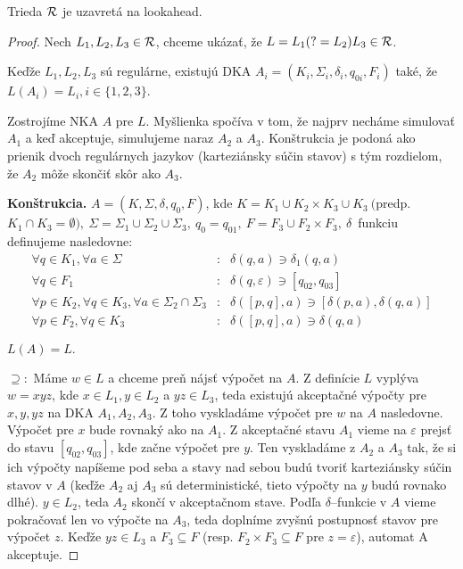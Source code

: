\begin{lema}
Trieda ${\cal R}$ je uzavretá na lookahead.
\end{lema}
\begin{proof}
Nech $ L_{1}, L_{2}, L_{3} \in {\cal R} $, chceme ukázať, že  $ L = L_{1}(?=L_{2})L_{3} \in {\cal R} $.

Keďže $ L_{1},L_{2},L_{3} $ sú regulárne, existujú DKA $ A_{i} = (K_{i},\Sigma_{i},\delta_{i},q_{0i},F_{i}) $ také, že $ L(A_{i})=L_{i}, i \in \lbrace 1,2,3\rbrace $. 

Zostrojíme NKA $ A $ pre $L$. Myšlienka spočíva v tom, že najprv necháme simulovať $A_1$ a keď akceptuje, simulujeme naraz $A_2$ a $A_3$. Konštrukcia je podoná ako prienik dvoch regulárnych jazykov (karteziánsky súčin stavov) s tým rozdielom, že $A_2$ môže skončiť skôr ako $A_3$.

\textbf{Konštrukcia.}  $ A = (K,\Sigma,\delta,q_{0},F) $, kde
$ K = K_{1} \cup K_{2} \times K_{3} \cup K_{3} ~ ( $predp. $ K_{1} \cap K_{3}= \emptyset), ~
\Sigma=\Sigma_{1}\cup\Sigma_{2}\cup\Sigma_{3}, ~ q_{0}=q_{01}, ~ F = F_{3} \cup F_{2} \times F_{3}, ~ \delta $~funkciu definujeme nasledovne:
\begin{eqnarray*}
\forall q \in K_{1}, \forall a \in \Sigma &:& \delta(q,a) \ni \delta_{1}(q,a) \\
\forall q \in F_{1} &:& \delta(q,\varepsilon ) \ni \left[ q_{02},q_{03} \right] \\
\forall p \in K_{2}, \forall q \in K_{3}, \forall a \in \Sigma_{2} \cap \Sigma_{3} &:& \delta( \left[ p,q \right] ,a) \ni \left[ \delta(p,a), \delta (q,a) \right] \\
\forall p \in F_2, \forall q \in K_3 &:& \delta(\left[p,q\right],a) \ni \delta(q,a) 
\end{eqnarray*}

$ L(A) = L. $

$ \supseteq: $ Máme $ w \in L $ a chceme preň nájsť výpočet na $A$. Z definície $L$ vyplýva $w=xyz$, kde $x \in L_1, y \in L_2$ a $yz \in L_3$, teda existujú akceptačné výpočty pre $x,y,yz$ na DKA $A_1,A_2,A_3$. Z toho vyskladáme výpočet pre $w$ na $A$ nasledovne. Výpočet pre $x$ bude rovnaký ako na $A_1$. Z akceptačné stavu $A_1$ vieme na $\varepsilon$ prejsť do stavu $\left[q_{02},q_{03}\right]$, kde začne výpočet pre $y$. Ten vyskladáme z $A_2$ a $A_3$ tak, že si ich výpočty napíšeme pod seba a stavy nad sebou budú tvoriť karteziánsky súčin stavov v $A$ (keďže $A_2$ aj $A_3$ sú deterministické, tieto výpočty na $y$ budú rovnako dlhé). $y \in L_2$, teda $A_2$ skončí v akceptačnom stave. Podľa $\delta$--funkcie v $A$ vieme pokračovať len vo výpočte na $A_3$, teda doplníme zvyšnú postupnosť stavov pre výpočet $z$. Keďže $yz \in L_3$ a $F_3\subseteq F$ (resp. $F_2\times F_3\subseteq F$ pre $z=\varepsilon$), automat A akceptuje. 


\end{proof}
